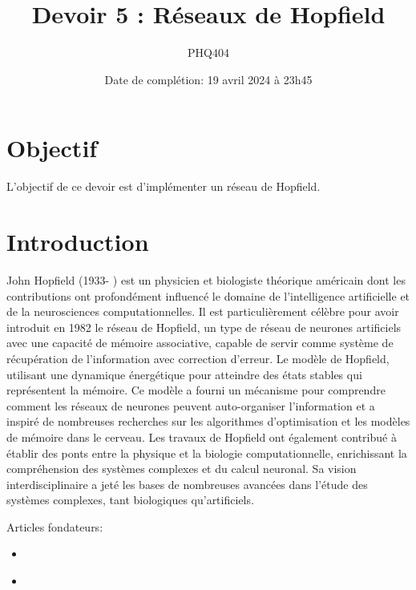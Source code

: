 \documentclass[12pt, letterpaper]{article}
\numberwithin{table}{section}
\numberwithin{figure}{section}
\numberwithin{equation}{section}
\begin{document}
\title{Devoir 5 : Réseaux de Hopfield}
\author{PHQ404}
\date{Date de complétion: 19 avril 2024 à 23h45}
\maketitle

\section{Objectif}\label{sec:objectif}

\noindent L'objectif de ce devoir est d'implémenter un réseau de Hopfield.


\section{Introduction}\label{sec:introduction}
\noindent John Hopfield (1933- ) est un physicien et biologiste théorique américain dont les contributions ont
profondément influencé le domaine de l'intelligence artificielle et de la neurosciences computationnelles.
Il est particulièrement célèbre pour avoir introduit en 1982 le réseau de Hopfield, un type de réseau de neurones
artificiels avec une capacité de mémoire associative, capable de servir comme système de récupération de l'information
avec correction d'erreur.
Le modèle de Hopfield, utilisant une dynamique énergétique pour atteindre des états stables qui représentent la
mémoire.
Ce modèle a fourni un mécanisme pour comprendre comment les réseaux de neurones peuvent auto-organiser l'information
et a inspiré de nombreuses recherches sur les algorithmes d'optimisation et les modèles de mémoire dans le cerveau.
Les travaux de Hopfield ont également contribué à établir des ponts entre la physique et la biologie computationnelle,
enrichissant la compréhension des systèmes complexes et du calcul neuronal.
Sa vision interdisciplinaire a jeté les bases de nombreuses avancées dans l'étude des systèmes complexes,
tant biologiques qu'artificiels.

\bigskip

\noindent Articles fondateurs:
\begin{itemize}[label=\textbullet]
    \item {}~\cite{hopfield1982neural}
    \item {}~\cite{hopfield1984neurons}
\end{itemize}
\end{document}
